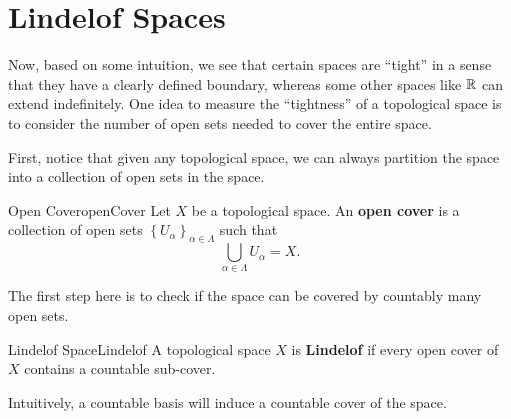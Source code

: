 \documentclass[math]{amznotes}
\theoremstyle{remark}
\begin{document}
\section{Lindelof Spaces}
Now, based on some intuition, we see that certain spaces are ``tight'' in a sense that they have a clearly defined boundary, whereas some other spaces like $\mathbb{R}$ can extend indefinitely. One idea to measure the ``tightness'' of a topological space is to consider the number of open sets needed to cover the entire space.

First, notice that given any topological space, we can always partition the space into a collection of open sets in the space.
\begin{dfnbox}{Open Cover}{openCover}
    Let $X$ be a topological space. An {\color{red} \textbf{open cover}} is a collection of open sets $\left\{U_{\alpha}\right\}_{\alpha \in \Lambda}$ such that 
    \begin{equation*}
        \bigcup_{\alpha \in \Lambda}U_{\alpha} = X.
    \end{equation*}
\end{dfnbox}
The first step here is to check if the space can be covered by countably many open sets.
\begin{dfnbox}{Lindelof Space}{Lindelof}
    A topological space $X$ is {\color{red} \textbf{Lindelof}} if every open cover of $X$ contains a countable sub-cover.
\end{dfnbox}
Intuitively, a countable basis will induce a countable cover of the space.
\end{document}

